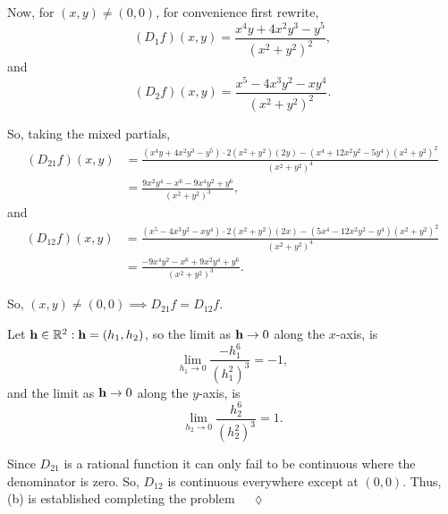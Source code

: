 \documentclass{article}
\newcommand\R{\mathbb{R}}
\begin{document}
Now, for $(x,y)\neq (0,0)$, for convenience first rewrite,
\[(D_1 f)(x,y) = \frac{x^4y+4x^2y^3-y^5}{(x^2+y^2)^2},\]
and
\[(D_2 f)(x,y) = \frac{x^5 -4x^3y^2-xy^4}{(x^2+y^2)^2}.\]

So, taking the mixed partials,
\begin{align*}
  (D_{21}
  f)(x,y) &= \frac{(x^4y+4x^2y^3-y^5)\cdot 2(x^2+y^2)(2y) -
            (x^4+12x^2y^2-5y^4)(x^2+y^2)^2}{(x^2+y^2)^4}\\
  &= \frac{9x^2y^4 -x^6-9x^4y^2+y^6}{(x^2+y^2)^3},
\end{align*}
and
\begin{align*}
  (D_{12} f)(x,y) &= \frac{(x^5 -4x^3y^2-xy^4)\cdot 2(x^2+y^2)(2x) - (5x^4 -12x^2y^2-y^4)(x^2+y^2)^2}{(x^2+y^2)^4}\\
                  &= \frac{ -9x^4y^2 - x^6   +9x^2y^4+y^6}{(x^2+y^2)^3}.
\end{align*}

So, $(x,y) \neq (0,0) \implies D_{21} f  = D_{12} f$.

Let $\vb{h}\in \R^2: \vb{h} = (h_1,h_2)$, so the limit as $\vb{h}\rightarrow 0$ along the $x$-axis, is
\[\lim_{h_1 \rightarrow  0} \frac{- h_1^6 }{(h_1^2)^3} = -1,\]
and the limit as $\vb{h}\rightarrow 0$ along the $y$-axis, is
\[\lim_{h_2 \rightarrow  0} \frac{h_2^6 }{(h_2^2)^3} = 1.\]

Since $D_{21}$ is a rational function it can only fail to be
continuous where the denominator is zero. So, $D_{12}$ is continuous
everywhere except at $(0,0)$. Thus, (b) is established completing the
problem $\quad \lozenge$
\end{document}
